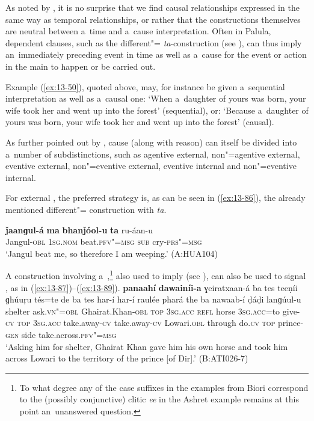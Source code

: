 As noted by \citet[247]{thompsonetal2007}, it is no surprise that we find causal relationships expressed in the same way as temporal relationships, or rather that the constructions themselves are neutral between a~time and a~cause interpretation. Often in Palula, dependent clauses, such as the different"= \textit{ta}-construction (see ), can thus imply an~immediately preceding event in time as well as a~cause for the event or action in the main  to happen or be carried out. 



Example (\ref{ex:13-50}), quoted above, may, for instance be given a~sequential interpretation as well as a~causal one: `When a~daughter of yours was born, your wife took her and went up into the forest' (sequential), or: `Because a~daughter of yours was born, your wife took her and went up into the forest' (causal).



As further pointed out by \citet[335]{givon2001b}, cause (along with reason) can itself be divided into a~number of subdistinctions, such as agentive external, non"=agentive external, eventive external, non"=eventive external, eventive internal and non"=eventive internal.



For external , the preferred strategy is, as can be seen in (\ref{ex:13-86}), the already mentioned  different"= construction with \textit{ta}.

\begin{exe}
\ex
\label{ex:13-86}
\gll \textbf{ǰaanɡul-á} \textbf{ma} \textbf{bhanǰóol-u} \textbf{ta} ru-áan-u  \\
Jangul-\textsc{obl} \textsc{1sg.nom} beat.\textsc{pfv"=msg} \textsc{sub} cry-\textsc{prs"=msg}  \\
\glt `Jangul beat me, so therefore I am weeping.' (A:HUA104)
\end{exe}

A construction involving a~,\footnote{To what degree any of the case suffixes in the examples from Biori correspond to the (possibly conjunctive) clitic \textit{ee} in the Ashret example remains at this point an~unanswered question.} also used to imply  (see ), can also be used to signal , as in (\ref{ex:13-87})--(\ref{ex:13-89}).
\ea
\label{ex:13-87}
\gll \textbf{panaahí} \textbf{dawainíi-a} ɣeiratxaan-á ba tes teeṇíi ɡhúuṛu tés=te de ba tes har-í har-í raulée phará the ba nawaab-í ḍáḍi lanɡúul-u \\
shelter ask.\textsc{vn"=obl} Ghairat.Khan-\textsc{obl} \textsc{top} \textsc{3sg.acc} \textsc{refl}  horse \textsc{3sg.acc}=to give-\textsc{cv} \textsc{top} \textsc{3sg.acc} take.away-\textsc{cv} take.away-\textsc{cv} Lowari.\textsc{obl} through do.\textsc{cv} \textsc{top} prince-\textsc{gen} side take.across.\textsc{pfv"=msg} \\
\glt `Asking him for shelter, Ghairat Khan gave him his own horse and took him across Lowari to the territory of the prince [of Dir].' (B:ATI026-7)

